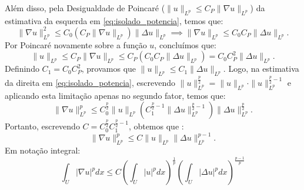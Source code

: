 \documentclass[cs_edp_2026.1.tex]{subfiles} %
\begin{document}
{\begin{equation}
	\end{equation}
	Além disso, pela Desigualdade de Poincaré ($\|u\|_{L^p} \le C_P \|\nabla u\|_{L^p}$) da estimativa da esquerda em \eqref{eq:isolado_potencia}, temos que:
	\begin{equation} \label{eq:prova_poincare}
		\|\nabla u\|_{L^p}^2 \le C_0 (C_P \|\nabla u\|_{L^p}) \|\Delta u\|_{L^p} \implies \|\nabla u\|_{L^p} \le C_0 C_P \|\Delta u\|_{L^p}.
	\end{equation}
	Por Poincaré novamente sobre a função $u$, concluímos que:
	\begin{equation*}
		\|u\|_{L^p} \le C_P \|\nabla u\|_{L^p} \le C_P (C_0 C_P \|\Delta u\|_{L^p}) = C_0 C_P^2 \|\Delta u\|_{L^p}.
	\end{equation*}
	Definindo $C_1 = C_0 C_P^2$, provamos que $\|u\|_{L^p} \le C_1 \|\Delta u\|_{L^p}$. Logo, na estimativa da direita em \eqref{eq:isolado_potencia}, escrevendo $\|u\|_{L^p}^{\frac{p}{2}} = \|u\|_{L^p} \cdot \|u\|_{L^p}^{\frac{p}{2}-1}$ e aplicando esta limitação apenas no segundo fator, temos que:
	\begin{equation} \label{eq:ajuste_poincare}
		\|\nabla u\|_{L^p}^p \le C_0^{\frac{p}{2}} \|u\|_{L^p} \left( C_1^{\frac{p}{2}-1} \|\Delta u\|_{L^p}^{\frac{p}{2}-1} \right) \|\Delta u\|_{L^p}^{\frac{p}{2}}.
	\end{equation}
	Portanto, escrevendo $C = C_0^{\frac{p}{2}} C_1^{\frac{p}{2}-1}$, obtemos que :
	\begin{equation} \label{eq:resultado_normas}
		\|\nabla u\|_{L^p}^p \le C \|u\|_{L^p} \|\Delta u\|_{L^p}^{p-1}.
	\end{equation}
	Em notação integral:
	$$\boxed{\int_U |\nabla u|^p dx \leq C \left( \int_U |u|^p dx \right)^{\frac{1}{p}} \left( \int_U |\Delta u|^p dx \right)^{\frac{p-1}{p}}}$$
}


\end{document}
